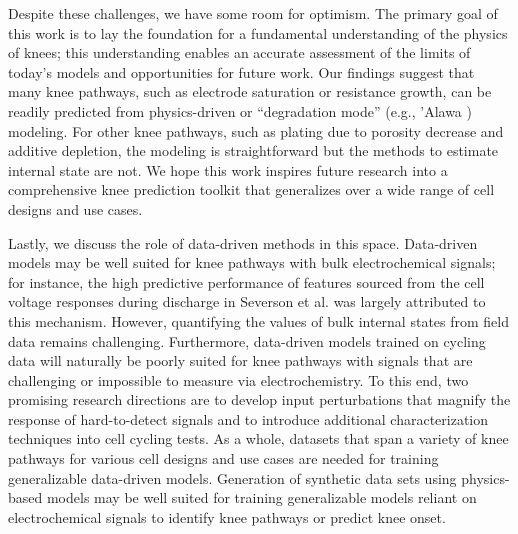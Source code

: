 \documentclass[journal=jpclcd,manuscript=article]{achemso}
\begin{document}
Despite these challenges, we have some room for optimism. The primary goal of this work is to lay the foundation for a fundamental understanding of the physics of knees; this understanding enables an accurate assessment of the limits of today’s models and opportunities for future work. Our findings suggest that many knee pathways, such as electrode saturation or resistance growth, can be readily predicted from physics-driven or ``degradation mode'' (e.g., 'Alawa \cite{dubarry_synthesize_2012, dubarry_big_2020}) modeling. For other knee pathways, such as plating due to porosity decrease and additive depletion, the modeling is straightforward but the methods to estimate internal state are not. We hope this work inspires future research into a comprehensive knee prediction toolkit that generalizes over a wide range of cell designs and use cases. 

Lastly, we discuss the role of data-driven methods in this space. Data-driven models may be well suited for knee pathways with bulk electrochemical signals; for instance, the high predictive performance of features sourced from the cell voltage responses during discharge in Severson et al.\cite{severson_data-driven_2019} was largely attributed to this mechanism. However, quantifying the values of bulk internal states from field data remains challenging\cite{aitio_predicting_2021, bian_state--health_2021, sulzer_challenge_2021}. Furthermore, data-driven models trained on cycling data will naturally be poorly suited for knee pathways with signals that are challenging or impossible to measure via electrochemistry. To this end, two promising research directions are to develop input perturbations that magnify the response of hard-to-detect signals and to introduce additional characterization techniques into cell cycling tests. As a whole, datasets that span a variety of knee pathways for various cell designs and use cases are needed for training generalizable data-driven models. Generation of synthetic data sets using physics-based models may be well suited for training generalizable models reliant on electrochemical signals to identify knee pathways or predict knee onset.\cite{dubarry_big_2020, kim_rapid_2021}
\end{document}
